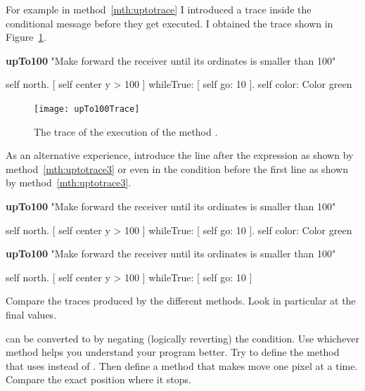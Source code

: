 For example in method~\ref{mth:uptotrace} I introduced a trace inside the conditional message before they get executed. I obtained the trace shown in Figure~\ref{fig:upTo100Trace}.

\begin{method}\label{mth:uptotrace}
\textbf{upTo100}
   "Make forward the receiver until its ordinates is smaller than 100"

   self north.
   [ self center y > 100 ]
      whileTrue: 
         [
         self go: 10 ].
   self color: Color green
\end{method}

\begin{figure}[h]
\begin{center}\texttt{[image: upTo100Trace]}\end{center}
\caption{The trace of the execution of the method . \label{fig:upTo100Trace}}
\end{figure}


As an alternative experience, introduce the  line  after the expression  as shown by method~\ref{mth:uptotrace3} or even in the condition before the first  line as shown by method~\ref{mth:uptotrace3}.


\begin{method}\label{mth:uptotrace2}
\textbf{upTo100}
   "Make forward the receiver until its ordinates is smaller than 100"

   self north.
   [
   self center y > 100 ]
      whileTrue: 
         [
         self go: 10 ].
   self color: Color green
\end{method}

\begin{method}\label{mth:uptotrace3}
\textbf{upTo100}
   "Make forward the receiver until its ordinates is smaller than 100"

   self north.
   [ self center y > 100 ]
      whileTrue: 
         [ self go: 10
        ] 
\end{method}

Compare the traces produced by the different methods. Look in particular at the final values. 

 can be converted to  by negating (logically reverting) the condition.  Use whichever method helps you understand  your program better. Try to define the method  that uses  instead of . Then define a method that makes move one pixel at a time. Compare the exact position where it stops.



